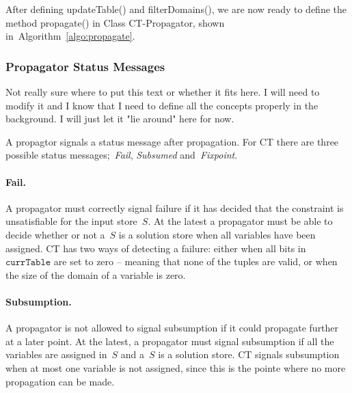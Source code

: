 \documentclass[a4paper,11pt]{article}
\newcommand{\Todo}[1]{{\color{blue}#1}}
\newcommand{\Algoref}[1]{Algorithm~\ref{#1}}
\newcommand{\CurrTable}{\texttt{currTable}}
\numberwithin{equation}{section}
\begin{document}
After defining updateTable() and filterDomains(), we are now ready to
define the method propagate() in Class CT-Propagator, shown 
in~\Algoref{algo:propagate}.

\begin{algorithm}[H]
  \begin{algorithmic}[1]  %
    
  \end{algorithmic}
  \caption{Method propagate() in Class CT-Propagator. updateTable()
    (\Algoref{algo:updateTable}) is
  called, and if the current table is empty, we are in a failed node.
  Otherwise, filterDomains() (\Algoref{algo:filterDomains})
  is called, and the return value of that method is returned.}
  \label{algo:propagate}
\end{algorithm}

\subsubsection{Propagator Status Messages}
\Todo{Not really sure where to put this text or whether it fits
here. I will need to modify it and I know that I need
to define all the concepts properly in the background.
I will just let it "lie around" here for now.}

A propagtor signals a status message after propagation.
For CT there are three possible status messages;~\emph{Fail},
\emph{Subsumed} and~\emph{Fixpoint}.

\paragraph{Fail.}
A propagator must correctly signal failure
if it has decided that the constraint is unsatisfiable for the input store~$S$.
At the latest a propagator must be
able to decide whether or not a~$S$ is a solution store when all
variables have been assigned.
CT has two ways of detecting a failure: either when all bits in~$\CurrTable$
are set to zero -- meaning that none of the tuples are valid, or when the
size of the domain of a variable is zero.

\paragraph{Subsumption.}
A propagator is not allowed to signal subsumption if it could propagate further
at a later point. At the latest, a propagator must signal subsumption if all the variables
are assigned in~$S$ and a~$S$ is a solution store.
CT signals subsumption when at most one variable is not assigned,
since this is the pointe where no more propagation can be made.
\end{document}
